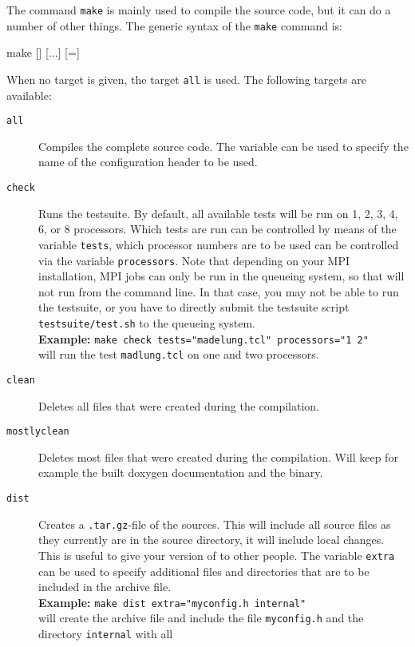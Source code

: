 The command \texttt{make} is mainly used to compile the \es source
code, but it can do a number of other things. The generic syntax of
the \texttt{make} command is:
\begin{code}
make [] [...] [=]
\end{code}
When no target is given, the target \texttt{all} is used. The
following targets are available:
\begin{description}
\item[\texttt{all}] Compiles the complete \es source code. The
  variable  can be used to specify the name of the
  configuration header to be used.
\item[\texttt{check}] Runs the testsuite. By default, all available
  tests will be run on 1, 2, 3, 4, 6, or 8 processors. Which tests are
  run can be controlled by means of the variable \texttt{tests}, which
  processor numbers are to be used can be controlled via the variable
  \texttt{processors}. Note that depending on your MPI installation,
  MPI jobs can only be run in the queueing system, so that \es{} will
  not run from the command line. In that case, you may not be able to
  run the testsuite, or you have to directly submit the testsuite script
  \verb!testsuite/test.sh! to the queueing system.\\
  \textbf{Example:} \verb!make check tests="madelung.tcl" processors="1 2"!\\
  will run the test \texttt{madlung.tcl} on one and two processors.
\item[\texttt{clean}] Deletes all files that were created during the
  compilation.
\item[\texttt{mostlyclean}] Deletes most files that were created
  during the compilation. Will keep for example the built doxygen
  documentation and the \es{} binary.
\item[\texttt{dist}] Creates a \texttt{.tar.gz}-file of the \es{}
  sources.  This will include all source files as they currently are
  in the source directory, \ie{} it will include local changes.  This
  is useful to give your version of \es{} to other people.
  The variable \texttt{extra} can be used to specify additional
  files and directories that are to be included in the archive
  file. \\
  \textbf{Example:} \verb!make dist extra="myconfig.h internal"!\\
  will create the archive file and include the file
  \texttt{myconfig.h} and the directory \texttt{internal} with all

\end{description}
